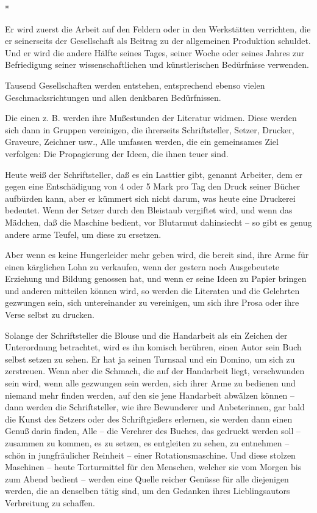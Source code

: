 \documentclass{scrbook}
\begin{document}
\begin{center}*\end{center}

Er wird zuerst die Arbeit auf den Feldern oder in den Werkstätten verrichten, die er seinerseits der Gesellschaft als Beitrag zu der allgemeinen Produktion schuldet. Und er wird die andere Hälfte seines Tages, seiner Woche oder seines Jahres zur Befriedigung seiner wissenschaftlichen und künstlerischen Bedürfnisse verwenden.

Tausend Gesellschaften werden entstehen, entsprechend ebenso vielen Geschmacksrichtungen und allen denkbaren Bedürfnissen.

Die einen z. B. werden ihre Mußestunden der Literatur widmen. Diese werden sich dann in Gruppen vereinigen, die ihrerseits Schriftsteller, Setzer, Drucker, Graveure, Zeichner usw., Alle umfassen werden, die ein gemeinsames Ziel verfolgen: Die Propagierung der Ideen, die ihnen teuer sind.

Heute weiß der Schriftsteller, daß es ein Lasttier gibt, genannt Arbeiter, dem er gegen eine Entschädigung von 4 oder 5 Mark pro Tag den Druck seiner Bücher aufbürden kann, aber er kümmert sich nicht darum, was heute eine Druckerei bedeutet. Wenn der Setzer durch den Bleistaub vergiftet wird, und wenn das Mädchen, daß die Maschine bedient, vor Blutarmut dahinsiecht – so gibt es genug andere arme Teufel, um diese zu ersetzen.

Aber wenn es keine Hungerleider mehr geben wird, die bereit sind, ihre Arme für einen kärglichen Lohn zu verkaufen, wenn der gestern noch Ausgebeutete Erziehung und Bildung genossen hat, und wenn er seine Ideen zu Papier bringen und anderen mitteilen können wird, so werden die Literaten und die Gelehrten gezwungen sein, sich untereinander zu vereinigen, um sich ihre Prosa oder ihre Verse selbst zu drucken.

Solange der Schriftsteller die Blouse und die Handarbeit als ein Zeichen der Unterordnung betrachtet, wird es ihn komisch berühren, einen Autor sein Buch selbst setzen zu sehen. Er hat ja seinen Turnsaal und ein Domino, um sich zu zerstreuen. Wenn aber die Schmach, die auf der Handarbeit liegt, verschwunden sein wird, wenn alle gezwungen sein werden, sich ihrer Arme zu bedienen und niemand mehr finden werden, auf den sie jene Handarbeit abwälzen können – dann werden die Schriftsteller, wie ihre Bewunderer und Anbeterinnen, gar bald die Kunst des Setzers oder des Schriftgießers erlernen, sie werden dann einen Genuß darin finden, Alle – die Verehrer des Buches, das gedruckt werden soll – zusammen zu kommen, es zu setzen, es entgleiten zu sehen, zu entnehmen – schön in jungfräulicher Reinheit – einer Rotationsmaschine. Und diese stolzen Maschinen – heute Torturmittel für den Menschen, welcher sie vom Morgen bis zum Abend bedient – werden eine Quelle reicher Genüsse für alle diejenigen werden, die an denselben tätig sind, um den Gedanken ihres Lieblingsautors Verbreitung zu schaffen.
\end{document}
